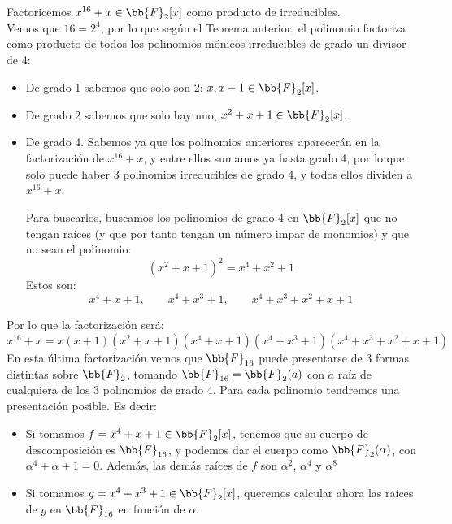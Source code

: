 \begin{ejemplo}
    Factoricemos $x^{16}+x\in \bb{F}_2[x]$ como producto de irreducibles.\\

    \noindent
    Vemos que $16 = 2^4$, por lo que según el Teorema anterior, el polinomio factoriza como producto de todos los polinomios mónicos irreducibles de grado un divisor de 4:
    \begin{itemize}
        \item De grado 1 sabemos que solo son 2: $x,x-1\in \bb{F}_2[x]$.
        \item De grado 2 sabemos que solo hay uno, $x^2+x+1\in \bb{F}_2[x]$.
        \item De grado 4. Sabemos ya que los polinomios anteriores aparecerán en la factorización de $x^{16}+x$, y entre ellos sumamos ya hasta grado 4, por lo que solo puede haber 3 polinomios irreducibles de grado 4, y todos ellos dividen a $x^{16}+x$.

            Para buscarlos, buscamos los polinomios de grado 4 en $\bb{F}_{2}[x]$ que no tengan raíces (y que por tanto tengan un número impar de monomios) y que no sean el polinomio:
            \begin{equation*}
                {(x^2+x+1)}^{2} = x^4+x^2+1
            \end{equation*}
            Estos son:
            \begin{equation*}
                x^4+x+1, \qquad x^4+x^3+1, \qquad x^4+x^3+x^2+x+1
            \end{equation*}
    \end{itemize}
    Por lo que la factorización será:
    \begin{equation*}
        x^{16}+x = x(x+1)(x^2+x+1)(x^4+x+1)(x^4+x^3+1)(x^4+x^3+x^2+x+1)
    \end{equation*}
    En esta última factorización vemos que $\bb{F}_{16}$ puede presentarse de 3 formas distintas sobre $\bb{F}_2$, tomando $\bb{F}_{16} = \bb{F}_2(a)$ con $a$ raíz de cualquiera de los 3 polinomios de grado 4. Para cada polinomio tendremos una presentación posible. Es decir:

    \begin{itemize}
        \item Si tomamos $f=x^4+x+1\in \bb{F}_2[x]$, tenemos que su cuerpo de descomposición es $\bb{F}_{16}$, y podemos dar el cuerpo como $\bb{F}_2(\alpha)$, con $\alpha^4 +\alpha+1=0$. Además, las demás raíces de $f$ son $\alpha^2$, $\alpha^4$ y $\alpha^8$
        \item Si tomamos $g=x^4+x^3+1\in \bb{F}_2[x]$, queremos calcular ahora las raíces de $g$ en $\bb{F}_{16}$ en función de $\alpha$.


\end{itemize}
\end{ejemplo}
